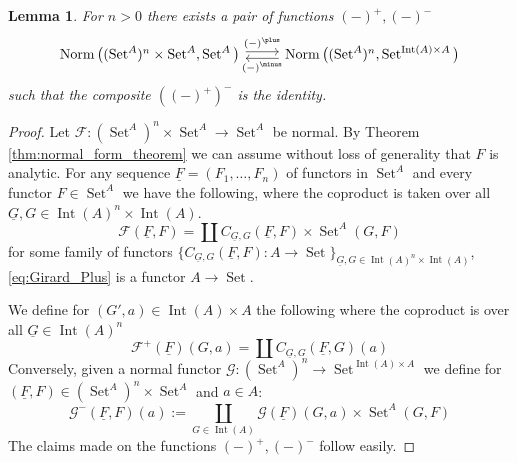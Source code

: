 \documentclass[12pt]{article}
\theoremstyle{plain}
\newtheorem{lemma}[thm]{Lemma}
\theoremstyle{definition}
\newcommand{\scr}[1]{\mathscr{#1}}
\newcommand{\lto}{\longrightarrow}
\DeclareMathOperator{\set}{Set}
\begin{document}
\begin{lemma}
    For $n > 0$ there exists a pair of functions $(-)^\plus, (-)^\minus$
    \begin{equation}
        \begin{tikzcd}
            \operatorname{Norm}\big((\set^A)^n \times \set^A, \set^A\big)\arrow[r,shift left, "{(-)^\plus}"] & \operatorname{Norm}\big((\set^A)^n, \set^{\operatorname{Int}(A) \times A}\big)\arrow[l, shift left, "{(-)^{\minus}}"]
        \end{tikzcd}
    \end{equation}
    such that the composite $((-)^+)^\minus$ is the identity.
\end{lemma}
\begin{proof}
    Let $\scr{F}: (\set^A)^n \times \set^A \lto \set^A$ be normal. By Theorem \ref{thm:normal_form_theorem} we can assume without loss of generality that $F$ is analytic. For any sequence $\underline{F} = (F_1, \ldots, F_n)$ of functors in $\set^A$ and every functor $F \in \set^A$ we have the following, where the coproduct is taken over all $\underline{G}, G \in \operatorname{Int}(A)^{n} \times \operatorname{Int}(A)$.
    \begin{equation}\label{eq:Girard_Plus}
        \scr{F}(\underline{F}, F) = \coprod C_{\underline{G}, G}(\underline{F},F) \times \operatorname{Set}^A(G, F)
    \end{equation}
    for some family of functors $\{ C_{\underline{G},G}(\underline{F}, F): A \lto \set\}_{\underline{G},G \in \operatorname{Int}(A)^n \times \operatorname{Int}(A) }$, \eqref{eq:Girard_Plus} is a functor $A \lto \set$.

    We define for $(G', a) \in \operatorname{Int}(A) \times A$ the following where the coproduct is over all $\underline{G} \in \operatorname{Int}(A)^n$
    \begin{equation}
        \scr{F}^+(\underline{F})(G, a) = \coprod C_{\underline{G}, G}(\underline{F}, G)(a)
    \end{equation}
    Conversely, given a normal functor $\scr{G}: (\set^A)^n \lto \set^{\operatorname{Int}(A) \times A}$ we define for $(\underline{F},F) \in (\set^A)^n \times \set^A$ and $a \in A$:
    \begin{equation}
        \scr{G}^-(\underline{F}, F)(a) := \coprod_{G \in \operatorname{Int}(A)} \scr{G}(\underline{F})(G,a) \times \set^A(G, F)
    \end{equation}
    The claims made on the functions $(-)^\plus, (-)^\minus$ follow easily.
\end{proof}
\end{document}
